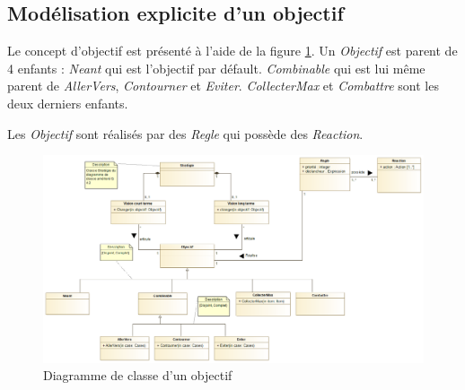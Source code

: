 
\subsection{Modélisation explicite d'un objectif}
\label{sec:question9}

Le concept d'objectif est présenté à l'aide de la figure \ref{fig:objectif}. Un \emph{Objectif} est parent de 4 enfants : \emph{Neant} qui est l'objectif par défault. \emph{Combinable} qui est lui même parent de \emph{AllerVers}, \emph{Contourner} et \emph{Eviter}.
\emph{CollecterMax} et \emph{Combattre} sont les deux derniers enfants.

Les \emph{Objectif} sont réalisés par des \emph{Regle} qui possède des \emph{Reaction}.

\begin{figure}
	\centering
	\includegraphics[width=500pt]{assets/class__Objectif}
	\caption{Diagramme de classe d'un objectif}
	\label{fig:objectif}
\end{figure}
